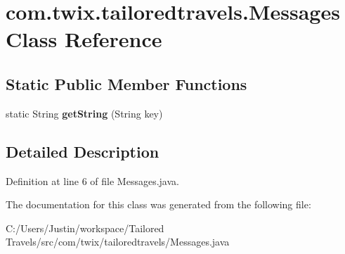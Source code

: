 \hypertarget{classcom_1_1twix_1_1tailoredtravels_1_1_messages}{\section{com.\-twix.\-tailoredtravels.\-Messages Class Reference}
\label{classcom_1_1twix_1_1tailoredtravels_1_1_messages}
}
\subsection*{Static Public Member Functions}
\begin{DoxyCompactItemize}
\item 
\hypertarget{classcom_1_1twix_1_1tailoredtravels_1_1_messages_a29a79118bab104acc63043a936dc89d6}{static String {\bfseries get\-String} (String key)}\label{classcom_1_1twix_1_1tailoredtravels_1_1_messages_a29a79118bab104acc63043a936dc89d6}

\end{DoxyCompactItemize}


\subsection{Detailed Description}


Definition at line 6 of file Messages.\-java.



The documentation for this class was generated from the following file\-:\begin{DoxyCompactItemize}
\item 
C\-:/\-Users/\-Justin/workspace/\-Tailored Travels/src/com/twix/tailoredtravels/Messages.\-java\end{DoxyCompactItemize}
